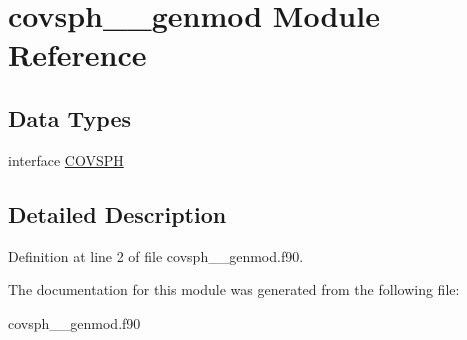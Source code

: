 \hypertarget{classcovsph____genmod}{\section{covsph\+\_\+\+\_\+genmod Module Reference}
\label{classcovsph____genmod}
}
\subsection*{Data Types}
\begin{DoxyCompactItemize}
\item 
interface \hyperlink{interfacecovsph____genmod_1_1_c_o_v_s_p_h}{C\+O\+V\+S\+P\+H}
\end{DoxyCompactItemize}


\subsection{Detailed Description}


Definition at line 2 of file covsph\+\_\+\+\_\+genmod.\+f90.



The documentation for this module was generated from the following file\+:\begin{DoxyCompactItemize}
\item 
covsph\+\_\+\+\_\+genmod.\+f90\end{DoxyCompactItemize}
